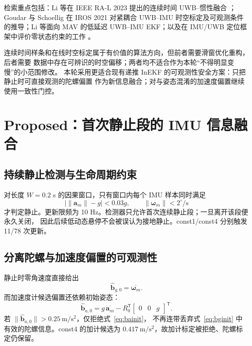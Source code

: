 \documentclass[11pt,a4paper]{ctexart}
\begin{document}
检索重点包括：Li 等在 IEEE RA-L 2023 提出的连续时间 UWB--惯性融合
\cite{li2023continuous}；Goudar 与 Schoellig 在 IROS 2021 对紧耦合 UWB--IMU
时空标定及可观测条件的推导\cite{goudar2021calibration}；Li 等面向 MAV 的低延迟
UWB--IMU EKF\cite{li2018mav}；以及在 IMU/UWB 定位框架中评价零状态约束的工作
\cite{kilic2023zu}。

连续时间样条和在线时空标定属于有价值的算法方向，但前者需要滑窗优化重构，后者需要
数据中存在可辨识的时空偏移；两者均不适合作为本轮“不得明显变慢”的小范围修改。
本轮采用更适合现有递推 InEKF 的可观测性安全方案：只把静止时可直接观测的陀螺偏置
作为新信息融合；对与姿态混淆的加速度偏置继续使用一致性门控。

\section{Proposed：首次静止段的 IMU 信息融合}

\subsection{持续静止检测与生命周期约束}

对长度 $W=0.2$ s 的因果窗口，只有窗口内每个 IMU 样本同时满足
\begin{equation}
 \big|\lVert\bm a_m\rVert-g\big|<0.03g,\qquad
 \lVert\bm\omega_m\rVert<2^\circ/\mathrm{s}
 \label{eq:detector}
\end{equation}
才判定静止。更新限频为 10 Hz。检测器只允许首次连续静止段；一旦离开该段便永久关闭，
因此后续低动态悬停不会被误认为接地静止。const1/const4 分别触发 11/78 次更新。

\subsection{分离陀螺与加速度偏置的可观测性}

静止时零角速度直接给出
\begin{equation}
 \hat{\bm b}_{g,0}=\overline{\bm\omega_m}.
 \label{eq:bginit}
\end{equation}
而加速度计候选偏置还依赖初始姿态：
\begin{equation}
 \hat{\bm b}_{a,0}=g\,\overline{\bm a_m}
 -R_0^{\mathsf T}\begin{bmatrix}0&0&g\end{bmatrix}^{\mathsf T}.
 \label{eq:bainit}
\end{equation}
若 $\lVert\hat{\bm b}_{a,0}\rVert>0.25\ \mathrm{m/s^2}$，仅拒绝式~\eqref{eq:bainit}，
不再连带丢弃式~\eqref{eq:bginit} 中有效的陀螺信息。const4 的加计候选为
$0.417\ \mathrm{m/s^2}$，故加计标定被拒绝、陀螺标定仍保留。
\end{document}
